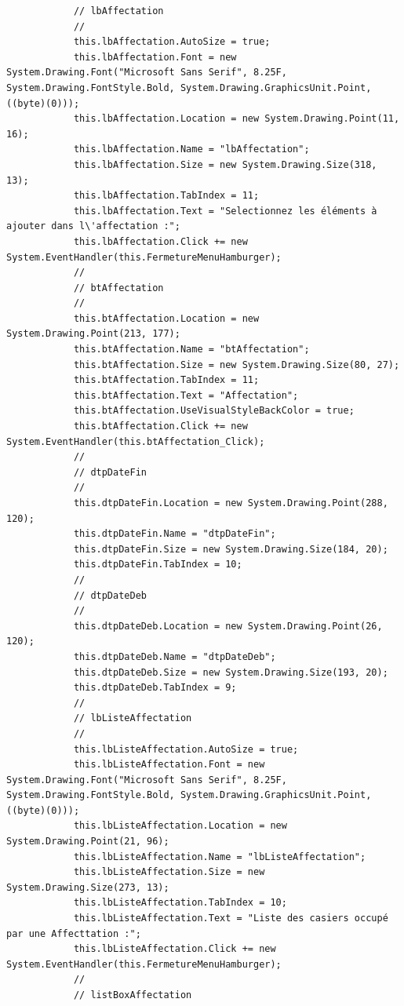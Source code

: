 \documentclass[main.tex]{subfiles}
\begin{document}
\begin{lstlisting}
            // lbAffectation
            // 
            this.lbAffectation.AutoSize = true;
            this.lbAffectation.Font = new System.Drawing.Font("Microsoft Sans Serif", 8.25F, System.Drawing.FontStyle.Bold, System.Drawing.GraphicsUnit.Point, ((byte)(0)));
            this.lbAffectation.Location = new System.Drawing.Point(11, 16);
            this.lbAffectation.Name = "lbAffectation";
            this.lbAffectation.Size = new System.Drawing.Size(318, 13);
            this.lbAffectation.TabIndex = 11;
            this.lbAffectation.Text = "Selectionnez les éléments à ajouter dans l\'affectation :";
            this.lbAffectation.Click += new System.EventHandler(this.FermetureMenuHamburger);
            // 
            // btAffectation
            // 
            this.btAffectation.Location = new System.Drawing.Point(213, 177);
            this.btAffectation.Name = "btAffectation";
            this.btAffectation.Size = new System.Drawing.Size(80, 27);
            this.btAffectation.TabIndex = 11;
            this.btAffectation.Text = "Affectation";
            this.btAffectation.UseVisualStyleBackColor = true;
            this.btAffectation.Click += new System.EventHandler(this.btAffectation_Click);
            // 
            // dtpDateFin
            // 
            this.dtpDateFin.Location = new System.Drawing.Point(288, 120);
            this.dtpDateFin.Name = "dtpDateFin";
            this.dtpDateFin.Size = new System.Drawing.Size(184, 20);
            this.dtpDateFin.TabIndex = 10;
            // 
            // dtpDateDeb
            // 
            this.dtpDateDeb.Location = new System.Drawing.Point(26, 120);
            this.dtpDateDeb.Name = "dtpDateDeb";
            this.dtpDateDeb.Size = new System.Drawing.Size(193, 20);
            this.dtpDateDeb.TabIndex = 9;
            // 
            // lbListeAffectation
            // 
            this.lbListeAffectation.AutoSize = true;
            this.lbListeAffectation.Font = new System.Drawing.Font("Microsoft Sans Serif", 8.25F, System.Drawing.FontStyle.Bold, System.Drawing.GraphicsUnit.Point, ((byte)(0)));
            this.lbListeAffectation.Location = new System.Drawing.Point(21, 96);
            this.lbListeAffectation.Name = "lbListeAffectation";
            this.lbListeAffectation.Size = new System.Drawing.Size(273, 13);
            this.lbListeAffectation.TabIndex = 10;
            this.lbListeAffectation.Text = "Liste des casiers occupé par une Affecttation :";
            this.lbListeAffectation.Click += new System.EventHandler(this.FermetureMenuHamburger);
            // 
            // listBoxAffectation

\end{lstlisting}
\end{document}
